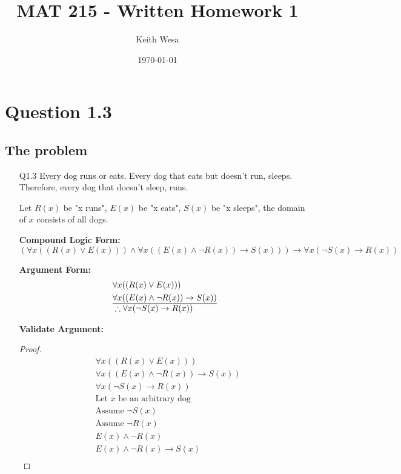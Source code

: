 \documentclass{article}
\author{Keith Wesa}
\title{MAT 215 - Written Homework 1}
\date{\today}
\begin{document}
\section*{Question 1.3}
\subsection*{The problem}
\begin{itemize}
    \item[Q1.3] Every dog runs or eats. Every dog that eats but doesn't run, sleeps.
    Therefore, every dog that doesn't sleep, runs.
    \item[] Let $R(x)$ be "x runs", $E(x)$ be "x eats", $S(x)$ be "x sleeps", the domain of $x$ consists of all dogs.
    \item[] \textbf{Compound Logic Form: } $(\forall x ((R(x) \lor E(x))) \land \forall x ((E(x) \land \neg R(x)) \rightarrow S(x))) \rightarrow \forall x (\neg S(x) \rightarrow R(x))$
    \item[] \textbf{Argument Form:}
    \begin{equation*}
        \begin{aligned}
            &\forall x ((R(x) \lor E(x))) \\
            &\forall x ((E(x) \land \neg R(x)) \rightarrow S(x)) \\
            \hline
            &\therefore \forall x (\neg S(x) \rightarrow R(x))
        \end{aligned}
    \end{equation*}
    \item[] \textbf{Validate Argument:}
     \begin{proof}
        \begin{align*}
            &\forall x ((R(x) \lor E(x))) \tag{Hypothesis} \\
            &\forall x ((E(x) \land \neg R(x)) \rightarrow S(x)) \tag{Hypothesis} \\
            &\forall x (\neg S(x) \rightarrow R(x)) \tag{Conclusion} \\
            &\text{Let } x \text{ be an arbitrary dog} \\
            &\text{Assume } \neg S(x) \tag{Assumption} \\
            &\text{Assume } \neg R(x) \tag{Assumption} \\
            &E(x) \land \neg R(x) \tag{Conjunction Introduction} \\
            &E(x) \land \neg R(x) \rightarrow S(x) \tag{Universal Instantiation} \\

\end{align*}
\end{proof}
\end{itemize}
\end{document}
